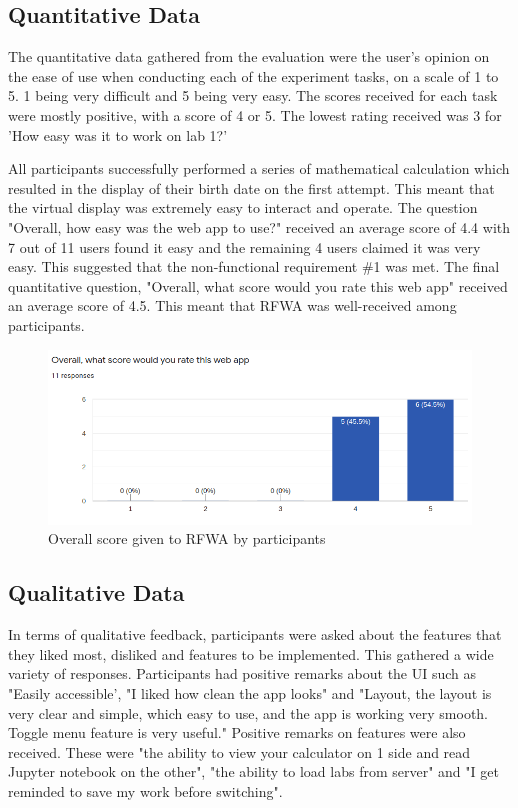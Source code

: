 \documentclass{l4proj}
\begin{document}
\subsection{Quantitative Data}
The quantitative data gathered from the evaluation were the user's opinion on the ease of use when conducting each of the experiment tasks, on a scale of 1 to 5. 1 being very difficult and 5 being very easy. The scores received for each task were mostly positive, with a score of 4 or 5. The lowest rating received was 3 for 'How easy was it to work on lab 1?'

All participants successfully performed a series of mathematical calculation which resulted in the display of their birth date on the first attempt. This meant that the virtual display was extremely easy to interact and operate. The question "Overall, how easy was the web app to use?" received an average score of 4.4 with 7 out of 11 users found it easy and the remaining 4 users claimed it was very easy. This suggested that the non-functional requirement \#1 was met. The final quantitative question, "Overall, what score would you rate this web app" received an average score of 4.5. This meant that RFWA was well-received among participants.

\begin{figure}[h]
    \centering
    \includegraphics[scale=0.5]{images/overall_results.png}
    \caption{Overall score given to RFWA by participants}
    \label{fig:overall_results}
\end{figure}

\subsection{Qualitative Data}

In terms of qualitative feedback, participants were asked about the features that they liked most, disliked and features to be implemented. This gathered a wide variety of responses. Participants had positive remarks about the UI such as "Easily accessible', "I liked how clean the app looks" and "Layout, the layout is very clear and simple, which easy to use, and the app is working very smooth. Toggle menu feature is very useful." Positive remarks on features were also received. These were "the ability to view your calculator on 1 side and read Jupyter notebook on the other", "the ability to load labs from server" and "I get reminded to save my work before switching".
\end{document}
